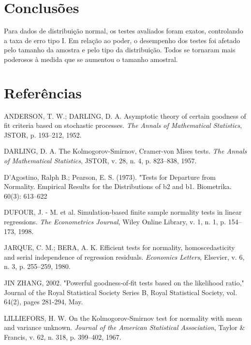 \documentclass[a4paper,11pt]{article} %
\begin{document}
\section{Conclusões}

Para dados de distribuição normal, os testes avaliados foram exatos, controlando a taxa de erro tipo I. Em relação ao poder, o desempenho dos testes foi afetado pelo tamanho da amostra e pelo tipo da distribuição. Todos se tornaram mais poderosos à medida que se aumentou o tamanho amostral. 


\section*{Referências}

\begin{flushleft}

\noindent ANDERSON, T. W.; DARLING, D. A. Asymptotic theory of certain goodness of fit criteria based on stochastic processes. {\it The Annals of Mathematical Statistics}, JSTOR, p. 193–212, 1952.\newline
    
\noindent DARLING, D. A. The Kolmogorov-Smirnov, Cramer-von Mises tests. {\it The Annals of Mathematical Statistics}, JSTOR, v. 28, n. 4, p. 823–838, 1957.\newline

\noindent D'Agostino, Ralph B.; Pearson, E. S. (1973). "Tests for Departure from Normality. Empirical Results for the Distributions of b2 and b1. Biometrika. 60(3): 613–622
\newline
    
\noindent DUFOUR, J. - M. et al. Simulation-based finite sample normality tests in linear regressions. {\it The Econometrics Journal}, Wiley Online Library, v. 1, n. 1, p. 154–173, 1998.\newline
    
\noindent JARQUE, C. M.; BERA, A. K. Efficient tests for normality, homoscedasticity and serial independence of regression residuals. {\it Economics Letters}, Elsevier, v. 6, n. 3, p. 255–259, 1980.\newline

\noindent JIN ZHANG, 2002. "Powerful goodness‐of‐fit tests based on the likelihood ratio," Journal of the Royal Statistical Society Series B, Royal Statistical Society, vol. 64(2), pages 281-294, May.\newline

\noindent LILLIEFORS, H. W. On the Kolmogorov-Smirnov test for normality with mean and variance unknown. {\it Journal of the American Statistical Association}, Taylor \& Francis, v. 62, n. 318, p. 399–402, 1967.\newline
    

\end{flushleft}
\end{document}
